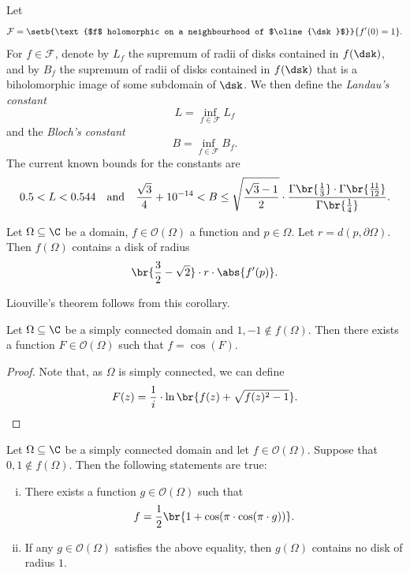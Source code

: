 \begin{opomba}
Let
\[
\mathcal{F} =
\setb{\text{$f$ holomorphic on a neighbourhood of $\oline{\dsk}$}}
{f'(0) = 1}.
\]
For $f \in \mathcal{F}$, denote by $L_f$ the supremum of radii of
disks contained in $f(\dsk)$, and by $B_f$ the supremum of radii of
disks contained in $f(\dsk)$ that is a biholomorphic image of some
subdomain of $\dsk$. We then define the \emph{Landau's constant}
\[
L = \inf_{f \in \mathcal{F}} L_f
\]
and the \emph{Bloch's constant}
\[
B = \inf_{f \in \mathcal{F}} B_f.
\]
The current known bounds for the constants are
\[
0.5 < L < 0.544
\quad \text{and} \quad
\frac{\sqrt{3}}{4} + 10^{-14} < B \leq
\sqrt{\frac{\sqrt{3} - 1}{2}} \cdot
\frac{\Gamma \br{\frac{1}{3}} \cdot \Gamma \br{\frac{11}{12}}}
{\Gamma \br{\frac{1}{4}}}.
\]
\end{opomba}

\begin{posledica}
\label{thm_hol:cor:bloch}
Let $\Omega \subseteq \C$ be a domain, $f \in \mathcal{O}(\Omega)$
a function and $p \in \Omega$. Let $r = d(p, \partial \Omega)$.
Then $f(\Omega)$ contains a disk of radius
\[
\br{\frac{3}{2} - \sqrt{2}} \cdot r \cdot \abs{f'(p)}.
\]
\end{posledica}

\obvs

\begin{opomba}
Liouville's theorem follows from this corollary.
\end{opomba}

\begin{lema}\label{thm_hol:lm:arcos}
Let $\Omega \subseteq \C$ be a simply connected domain and
$1, -1 \not \in f(\Omega)$. Then there exists a function
$F \in \mathcal{O}(\Omega)$ such that $f = \cos(F)$.
\end{lema}

\begin{proof}
Note that, as $\Omega$ is simply connected, we can define
\[
F(z) =
\frac{1}{i} \cdot \ln \br{f(z) + \sqrt{f(z)^2-1}}. \qedhere
\]
\end{proof}

\begin{izrek}
Let $\Omega \subseteq \C$ be a simply connected domain and let
$f \in \mathcal{O}(\Omega)$. Suppose that
$0, 1 \not \in f(\Omega)$. Then the following statements are true:

\begin{enumerate}[i)]
\item There exists a function $g \in \mathcal{O}(\Omega)$ such that
\[
f = \frac{1}{2} \br{1 + \cos(\pi \cdot \cos(\pi \cdot g))}.
\]
\item If any $g \in \mathcal{O}(\Omega)$ satisfies the above
equality, then $g(\Omega)$ contains no disk of radius $1$.
\end{enumerate}
\end{izrek}

